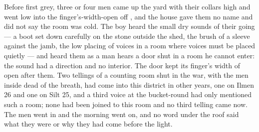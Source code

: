 Before first grey, three or four men came up the yard with their collars high and went low into the finger's-width-open  off , and the house gave them no name and did not say the room was cold. The boy heard the small dry sounds of their going --- a boot set down carefully on the stone outside the shed, the brush of a sleeve against the jamb, the low placing of voices in a room where voices must be placed quietly --- and heard them as a man hears a door shut in a room he cannot enter: the sound had a direction and no interior. The door kept its finger's width of open after them. Two tellings of a counting room shut in the war, with the men inside dead of the breath, had come into this district in other years, one on Ilmen 26 and one on Silt 25, and a third voice at the bucket-round had only mentioned such a room; none had been joined to this room and no third telling came now. The men went in and the morning went on, and no word under the roof said what they were or why they had come before the light.

\scenebreak

